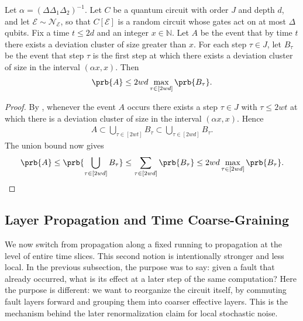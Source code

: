 \begin{claim}
Let $\alpha=(\Delta\Delta_{1}\Delta_{2})^{-1}$. Let $C$ be a quantum circuit with order $J$ and depth $d$, and let $\mathcal{E}\sim\mathcal{N}_{\mathcal{E}}$, so that $C[\mathcal{E}]$ is a random circuit whose gates act on at most $\Delta$ qubits. Fix a time $t\le 2d$ and an integer $x\in\mathbb{N}$. Let $A$ be the event that by time $t$ there exists a deviation cluster of size greater than $x$. For each step $\tau\in J$, let $B_{\tau}$ be the event that step $\tau$ is the first step at which there exists a deviation cluster of size in the interval $(\alpha x,x)$. Then
  \begin{equation*}
    \begin{split}
      \prb{A} \le 2wd\max_{\tau\in[2wd]}\prb{B_{\tau}}.
    \end{split}
  \end{equation*}
\end{claim}
\begin{proof}
By , whenever the event $A$ occurs there exists a step $\tau\in J$ with $\tau\le 2wt$ at which there is a deviation cluster of size in the interval $(\alpha x,x)$. Hence
  \begin{equation*}
    \begin{split}
      A \subset \bigcup_{\tau\in[2wt]} B_{\tau} \subset \bigcup_{\tau\in[2wd]} B_{\tau}.
    \end{split}
  \end{equation*}
The union bound now gives
  \begin{equation*}
    \begin{split}
      \prb{A}
      \le \prb{\bigcup_{\tau\in[2wd]} B_{\tau}}
      \le \sum_{\tau\in[2wd]} \prb{B_{\tau}}
      \le 2wd\max_{\tau\in[2wd]}\prb{B_{\tau}}.
    \end{split}
  \end{equation*}
\end{proof}

\subsection{Layer Propagation and Time Coarse-Graining}

We now switch from propagation along a fixed running to propagation at the level of entire time slices. This second notion is intentionally stronger and less local. In the previous subsection, the purpose was to say: given a fault that already occurred, what is its effect at a later step of the same computation? Here the purpose is different: we want to reorganize the circuit itself, by commuting fault layers forward and grouping them into coarser effective layers. This is the mechanism behind the later renormalization claim for local stochastic noise.

